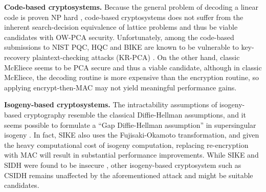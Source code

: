 \documentclass[journal=tches,submission]{iacrtrans}
\begin{document}
\textbf{Code-based cryptosystems.} Because the general problem of decoding a linear code is proven NP hard \cite{DBLP:journals/tit/BerlekampMT78}, code-based cryptosystems does not suffer from the inherent search-decision equivalence of lattice problems and thus be viable candidates with OW-PCA security. Unfortunately, among the code-based submissions to NIST PQC, HQC \cite{melchor2018hamming} and BIKE \cite{aragon2022bike} are known to be vulnerable to key-recovery plaintext-checking attacks (KR-PCA) \cite{DBLP:journals/tches/TanakaUXITH23}. On the other hand, classic McEliece \cite{classicmceliecespec} seems to be PCA secure and thus a viable candidate, although in classic McEliece, the decoding routine is more expensive than the encryption routine, so applying encrypt-then-MAC may not yield meaningful performance gains.

\textbf{Isogeny-based cryptosystems.} The intractability assumptions of isogeny-based cryptography resemble the classical Diffie-Hellman assumptions, and it seems possible to formulate a ``Gap Diffie-Hellman assumption'' in supersingular isogeny \cite{DBLP:conf/icisc/FujiokaTTY18}. In fact, SIKE \cite{azarderakhsh2017supersingular} also uses the Fujisaki-Okamoto transformation, and given the heavy computational cost of isogeny computation, replacing re-encryption with MAC will result in substantial performance improvements. While SIKE and SIDH were found to be insecure \cite{DBLP:conf/eurocrypt/CastryckD23}, other isogeny-based cryptosystem such as CSIDH \cite{DBLP:conf/asiacrypt/Castryck0MPR18} remains unaffected by the aforementioned attack and might be suitable candidates.




\end{document}
